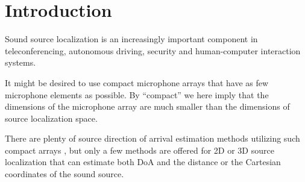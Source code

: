 \documentclass[applsci,article,submit,moreauthors,pdftex]{Definitions/mdpi}
\begin{document}


\section{Introduction}
Sound source localization is an increasingly important component in teleconferencing, autonomous driving, security and human-computer interaction systems.

It might be desired to use compact microphone arrays that have as few microphone elements as possible. By ``compact'' we here imply that the dimensions of the microphone array are much smaller than the dimensions of source localization space.

There are plenty of source direction of arrival estimation methods utilizing such compact arrays \cite{}, but only a few methods are offered for 2D or 3D source localization that can estimate both DoA and the distance or the Cartesian coordinates of the sound source.

\end{document}

